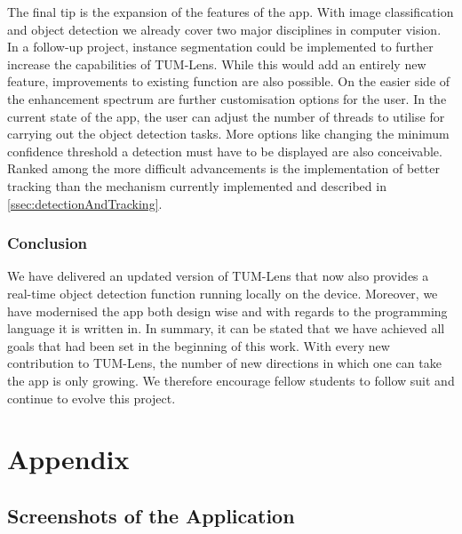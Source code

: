 \documentclass[
			   fontsize=11pt,
               paper=a4,
               bibliography=totoc,
               idxtotoc,
               headsepline,
               footsepline,
               footinclude=false,
               BCOR=12mm,
               DIV=13,
               openany,   %
               ]
               {scrbook}
\begin{document}
The final tip is the expansion of the features of the app. With image classification and object detection we already cover two major disciplines in computer vision. In a follow-up project, instance segmentation could be implemented to further increase the capabilities of TUM-Lens. While this would add an entirely new feature, improvements to existing function are also possible. On the easier side of the enhancement spectrum are further customisation options for the user. In the current state of the app, the user can adjust the number of threads to utilise for carrying out the object detection tasks. More options like changing the minimum confidence threshold a detection must have to be displayed are also conceivable. Ranked among the more difficult advancements is the implementation of better tracking than the mechanism currently implemented and described in \autoref{ssec:detectionAndTracking}.

\section{Conclusion}

We have delivered an updated version of TUM-Lens that now also provides a real-time object detection function running locally on the device. Moreover, we have modernised the app both design wise and with regards to the programming language it is written in. In summary, it can be stated that we have achieved all goals that had been set in the beginning of this work. With every new contribution to TUM-Lens, the number of new directions in which one can take the app is only growing. We therefore encourage fellow students to follow suit and continue to evolve this project.


\appendix


\part{Appendix}


\chapter{Screenshots of the Application}
\end{document}
